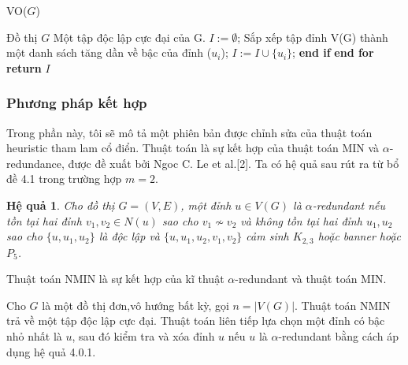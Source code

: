 \documentclass[14pt, oneside, a4paper, openany]{scrartcl}
\newtheorem{corollary}{Hệ quả}[theorem]
\begin{document}
\begin{algorithm}
	\caption{VO($G$)}\label{VO}
	\begin{algorithmic}[1]
		\INPUT Đồ thị $G$
		\OUTPUT Một tập độc lập cực đại của G.
		\State $I := \emptyset$;
		\State Sắp xếp tập đỉnh V(G) thành một danh sách tăng dần về bậc của đỉnh ($u_i$);
				\State $I:= I \cup \{u_i\}$;
			\EndIf
			\State \textbf{end if}					
		\EndFor
		\State \textbf{end for}
		\State \textbf{return} $I$
	\end{algorithmic}
\end{algorithm}


\subsubsection{Phương pháp kết hợp}
Trong phần này, tôi sẽ mô tả một phiên bản được chỉnh sửa của thuật toán heuristic tham lam cổ điển. Thuật toán là sự kết hợp của thuật toán MIN và 
$\alpha$-redundance, được đề xuất bởi Ngoc C. Le et al.[2].
Ta có hệ quả sau rút ra từ bổ đề 4.1 trong trường hợp $m=2$.
\begin{corollary}
	Cho đồ thị $G = (V,E)$, một đỉnh $u \in V(G)$ là $\alpha$-redundant nếu tồn tại hai đỉnh $v_1, v_2 \in N(u)$ sao cho $v_1 \nsim v_2$ và không tồn tại hai đỉnh $u_1, u_2$ sao cho $\{u,u_1,u_2\}$ là độc lập và $\{u,u_1,u_2,v_1,v_2\}$ cảm sinh $K_{2,3}$ hoặc banner hoặc $P_5$.
\end{corollary}

Thuật toán NMIN  là sự kết hợp của kĩ thuật $\alpha$-redundant và thuật toán MIN.

Cho $G$ là một đồ thị đơn,vô hướng bất kỳ, gọi $n = |V(G)|$. Thuật toán NMIN trả về một tập độc lập cực đại. Thuật toán liên tiếp lựa chọn một đỉnh có bậc nhỏ nhất là $u$, sau đó kiểm tra và xóa đỉnh $u$ nếu $u$ là $\alpha$-redundant bằng cách áp dụng hệ quả 4.0.1.
\end{document}
